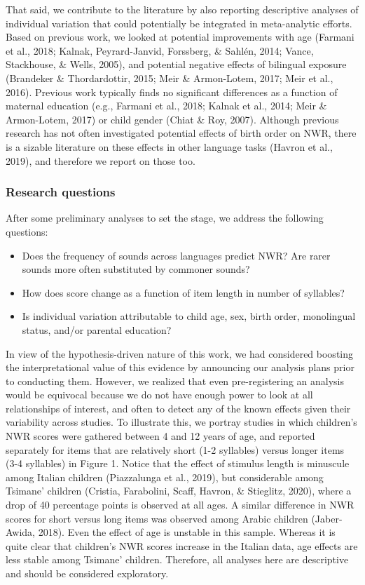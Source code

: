\documentclass[english,,man,floatsintext]{apa6}
\providecommand{\tightlist}{%
  \setlength{\itemsep}{0pt}\setlength{\parskip}{0pt}}
\begin{document}
That said, we contribute to the literature by also reporting descriptive
analyses of individual variation that could potentially be integrated in
meta-analytic efforts. Based on previous work, we looked at potential
improvements with age (Farmani et al., 2018; Kalnak, Peyrard-Janvid,
Forssberg, \& Sahlén, 2014; Vance, Stackhouse, \& Wells, 2005), and
potential negative effects of bilingual exposure (Brandeker \&
Thordardottir, 2015; Meir \& Armon-Lotem, 2017; Meir et al., 2016).
Previous work typically finds no significant differences as a function
of maternal education (e.g., Farmani et al., 2018; Kalnak et al., 2014;
Meir \& Armon-Lotem, 2017) or child gender (Chiat \& Roy, 2007).
Although previous research has not often investigated potential effects
of birth order on NWR, there is a sizable literature on these effects in
other language tasks (Havron et al., 2019), and therefore we report on
those too.

\subsubsection{Research questions}\label{research-questions}

After some preliminary analyses to set the stage, we address the
following questions:

\begin{itemize}
\tightlist
\item
  Does the frequency of sounds across languages predict NWR? Are rarer
  sounds more often substituted by commoner sounds?
\item
  How does score change as a function of item length in number of
  syllables?
\item
  Is individual variation attributable to child age, sex, birth order,
  monolingual status, and/or parental education? 
\end{itemize}

In view of the hypothesis-driven nature of this work, we had considered
boosting the interpretational value of this evidence by announcing our
analysis plans prior to conducting them. However, we realized that even
pre-registering an analysis would be equivocal because we do not have
enough power to look at all relationships of interest, and often to
detect any of the known effects given their variability across studies.
To illustrate this, we portray studies in which children's NWR scores
were gathered between 4 and 12 years of age, and reported separately for
items that are relatively short (1-2 syllables) versus longer items (3-4
syllables) in Figure 1. Notice that the effect of stimulus length is
minuscule among Italian children (Piazzalunga et al., 2019), but
considerable among Tsimane' children (Cristia, Farabolini, Scaff,
Havron, \& Stieglitz, 2020), where a drop of 40 percentage points is
observed at all ages. A similar difference in NWR scores for short
versus long items was observed among Arabic children (Jaber-Awida,
2018). Even the effect of age is unstable in this sample. Whereas it is
quite clear that children's NWR scores increase in the Italian data, age
effects are less stable among Tsimane' children. Therefore, all analyses
here are descriptive and should be considered exploratory.
\end{document}
